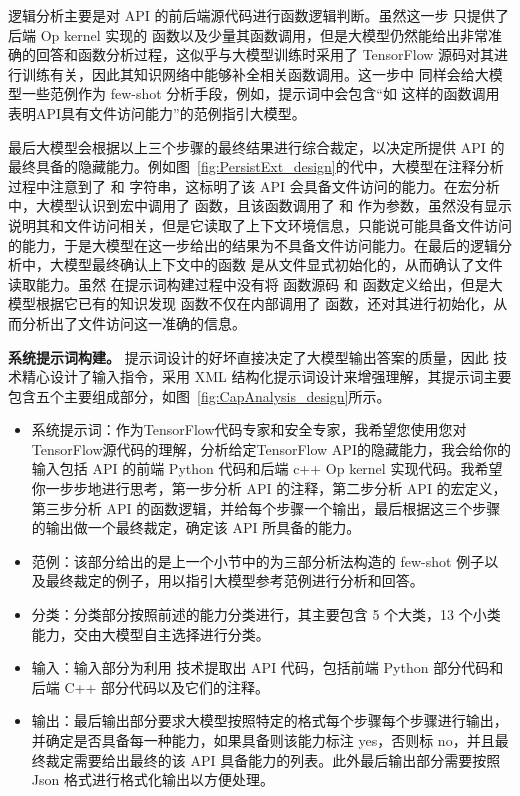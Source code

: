 逻辑分析主要是对 API 的前后端源代码进行函数逻辑判断。虽然这一步  只提供了后端 Op kernel 实现的  函数以及少量其函数调用，但是大模型仍然能给出非常准确的回答和函数分析过程，这似乎与大模型训练时采用了 TensorFlow 源码对其进行训练有关，因此其知识网络中能够补全相关函数调用。这一步中  同样会给大模型一些范例作为 few-shot 分析手段，例如，提示词中会包含“如  这样的函数调用表明API具有文件访问能力”的范例指引大模型。

最后大模型会根据以上三个步骤的最终结果进行综合裁定，以决定所提供 API 的最终具备的隐藏能力。例如图~\ref{fig:PersistExt_design}的代中，大模型在注释分析过程中注意到了  和 字符串，这标明了该 API 会具备文件访问的能力。在宏分析中，大模型认识到宏中调用了  函数，且该函数调用了  和  作为参数，虽然没有显示说明其和文件访问相关，但是它读取了上下文环境信息，只能说可能具备文件访问的能力，于是大模型在这一步给出的结果为不具备文件访问能力。在最后的逻辑分析中，大模型最终确认上下文中的函数 是从文件显式初始化的，从而确认了文件读取能力。虽然  在提示词构建过程中没有将  函数源码 和  函数定义给出，但是大模型根据它已有的知识发现  函数不仅在内部调用了  函数，还对其进行初始化，从而分析出了文件访问这一准确的信息。

\textbf{系统提示词构建。}
提示词设计的好坏直接决定了大模型输出答案的质量，因此  技术精心设计了输入指令，采用 XML 结构化提示词设计来增强理解，其提示词主要包含五个主要组成部分，如图~\ref{fig:CapAnalysis_design}所示。

\begin{itemize}
    \item 系统提示词：作为TensorFlow代码专家和安全专家，我希望您使用您对TensorFlow源代码的理解，分析给定TensorFlow API的隐藏能力，我会给你的输入包括 API 的前端 Python 代码和后端 c++ Op kernel 实现代码。我希望你一步步地进行思考，第一步分析 API 的注释，第二步分析 API 的宏定义，第三步分析 API 的函数逻辑，并给每个步骤一个输出，最后根据这三个步骤的输出做一个最终裁定，确定该 API 所具备的能力。
    \item 范例：该部分给出的是上一个小节中的为三部分析法构造的 few-shot 例子以及最终裁定的例子，用以指引大模型参考范例进行分析和回答。
    \item 分类：分类部分按照前述的能力分类进行，其主要包含 5 个大类，13 个小类能力，交由大模型自主选择进行分类。
    \item 输入：输入部分为利用  技术提取出 API 代码，包括前端 Python 部分代码和后端 C++ 部分代码以及它们的注释。
    \item 输出：最后输出部分要求大模型按照特定的格式每个步骤每个步骤进行输出，并确定是否具备每一种能力，如果具备则该能力标注 yes，否则标 no，并且最终裁定需要给出最终的该 API 具备能力的列表。此外最后输出部分需要按照 Json 格式进行格式化输出以方便处理。
\end{itemize}


